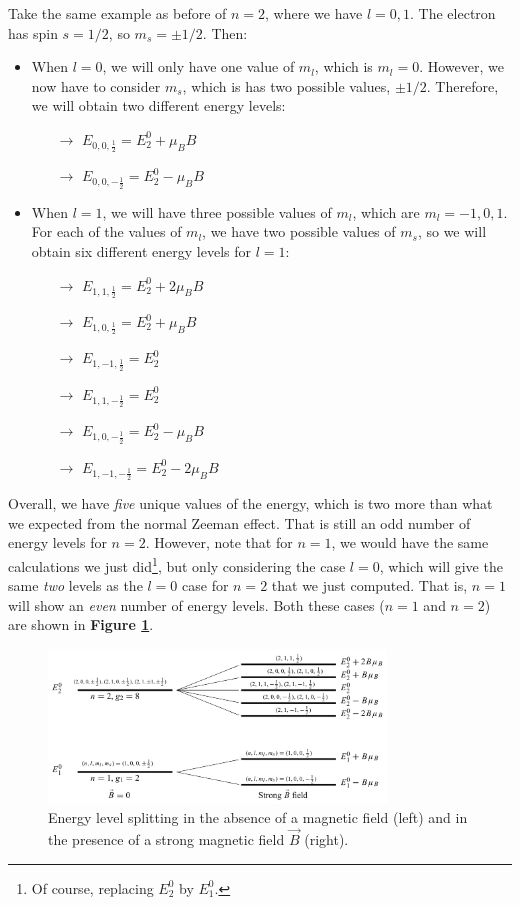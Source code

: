 Take the same example as before of $n=2$, where we have $l = 0, 1$. The electron has spin $s=1/2$, so $m_s=\pm 1/2$. Then:
\begin{itemize}
    \item When $l=0$, we will only have one value of $m_l$, which is $m_l = 0$. However, we now have to consider $m_s$, which is has two possible values, $\pm 1/2$. Therefore, we will obtain two different energy levels:
    \begin{itemize}
        \item[$\to$] $E_{0,0,\frac12} = E_2^0 +\mu_B B$
        \item[$\to$] $E_{0,0,-\frac12} = E_2^0 -\mu_B B$
    \end{itemize}
    \item When $l=1$, we will have three possible values of $m_l$, which are $m_l = -1, 0, 1$. For each of the values of $m_l$, we have two possible values of $m_s$, so we will obtain six different energy levels for $l=1$:
    \begin{itemize}
        \item[$\to$] $E_{1,1,\frac12} = E_2^0 + 2\mu_B B$
        \item[$\to$] $E_{1,0,\frac12} = E_2^0 + \mu_B B$
        \item[$\to$] $E_{1,-1,\frac12} = E_2^0$
        \item[$\to$] $E_{1,1,-\frac12} = E_2^0$
        \item[$\to$] $E_{1,0,-\frac12} = E_2^0 - \mu_B B$
        \item[$\to$] $E_{1,-1,-\frac12} = E_2^0 - 2\mu_B B$
    \end{itemize}
\end{itemize}

Overall, we have \textit{five} unique values of the energy, which is two more than what we expected from the normal Zeeman effect. That is still an odd number of energy levels for $n=2$. However, note that for $n = 1$, we would have the same calculations we just did\footnote{Of course, replacing $E_2^0$ by $E_1^0$.}, but only considering the case $l=0$, which will give the same \textit{two} levels as the $l=0$ case for $n=2$ that we just computed. That is, $n=1$ will show an \textit{even} number of energy levels. Both these cases ($n=1$ and $n=2$) are shown in \textbf{Figure \ref{fig:strong_B_zeeman}}.

\begin{figure}[htbp]
    \centering
    \includegraphics[width=0.8\textwidth]{images/strong_B_zeeman.png}
    \caption{Energy level splitting in the absence of a magnetic field (left) and in the presence of a strong magnetic field $\vec{B}$ (right).}
    \label{fig:strong_B_zeeman}
\end{figure}

